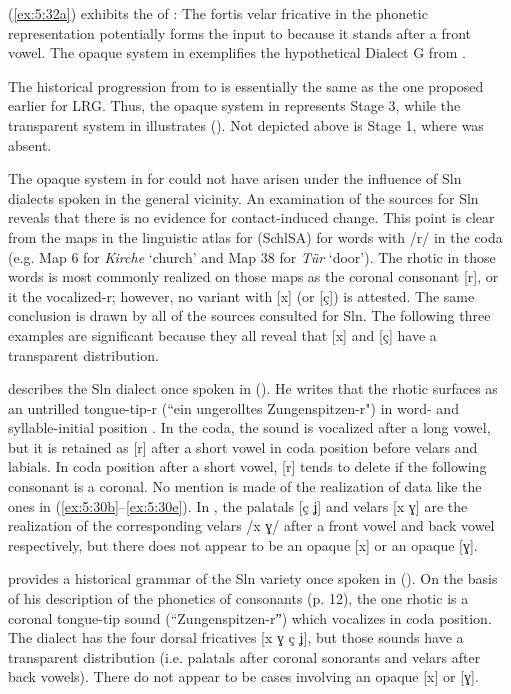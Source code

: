 (\ref{ex:5:32a}) exhibits the  of : The fortis velar fricative in the phonetic representation potentially forms the input to  because it stands after a front vowel. The opaque system in  exemplifies the hypothetical Dialect G from .

The historical progression from  to  is essentially the same as the one proposed earlier for LRG. Thus, the opaque  system in  represents Stage 3, while the transparent system in  illustrates  (). Not depicted above is Stage 1, where  was absent.

The opaque system in  for  could not have arisen under the influence of Sln dialects spoken in the general vicinity. An examination of the sources for Sln reveals that there is no evidence for contact-induced change. This point is clear from the maps in the linguistic atlas for  (SchlSA) for words with /r/ in the coda (e.g. Map 6 for \textit{Kirche} ‘church’ and Map 38 for \textit{Tür} ‘door’). The rhotic in those words is most commonly realized on those maps as the coronal consonant [r], or it the vocalized-r; however, no variant with [x] (or [ç]) is attested. The same conclusion is drawn by all of the sources consulted for Sln. The following three examples are significant because they all reveal that [x] and [ç] have a transparent distribution.\largerpage

\citet{Halbsguth1938} describes the Sln dialect once spoken in  (). He writes that the rhotic surfaces as an untrilled tongue-tip-r (“ein ungerolltes Zungenspitzen-r") in word- and syllable-initial position \citep[29--30]{Halbsguth1938}. In the coda, the sound is vocalized after a long vowel, but it is retained as [r] after a short vowel in coda position before velars and labials. In coda position after a short vowel, [r] tends to delete if the following consonant is a coronal. No mention is made of the realization of data like the ones in (\ref{ex:5:30b}--\ref{ex:5:30e}). In , the palatals [ç ʝ] and velars [x ɣ] are the realization of the corresponding velars /x ɣ/ after a front vowel and back vowel respectively, but there does not appear to be an opaque [x] or an opaque [ɣ].

\citet{Pautsch1901} provides a historical grammar of the Sln variety once spoken in  (). On the basis of his description of the phonetics of consonants (p. 12), the one rhotic is a coronal tongue-tip sound (“Zungenspitzen-rˮ) which vocalizes in coda position. The dialect has the four dorsal fricatives [x ɣ ç ʝ], but those sounds have a transparent distribution (i.e. palatals after coronal sonorants and velars after back vowels). There do not appear to be cases involving an opaque [x] or [ɣ].

